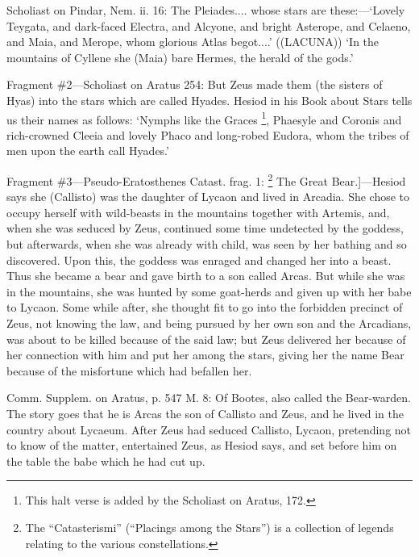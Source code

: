 Scholiast on Pindar, Nem. ii. 16: The Pleiades.... whose stars are
these:—‘Lovely Teygata, and dark-faced Electra, and Alcyone, and
bright Asterope, and Celaeno, and Maia, and Merope, whom glorious Atlas
begot....’ ((LACUNA)) ‘In the mountains of Cyllene she (Maia) bare
Hermes, the herald of the gods.’

Fragment \#2—Scholiast on Aratus 254: But Zeus made them (the sisters of
Hyas) into the stars which are called Hyades. Hesiod in his Book about Stars
tells us their names as follows: ‘Nymphs like the Graces \footnote{This halt verse is added
by the Scholiast on Aratus, 172.}, Phaesyle and Coronis and
rich-crowned Cleeia and lovely Phaco and long-robed Eudora, whom the tribes of
men upon the earth call Hyades.’

Fragment \#3—Pseudo-Eratosthenes Catast. frag. 1: \footnote{The
“Catasterismi” (“Placings among the Stars”) is a
collection of legends relating to the various constellations.} The Great
Bear.]—Hesiod says she (Callisto) was the daughter of Lycaon and lived in
Arcadia. She chose to occupy herself with wild-beasts in the mountains together
with Artemis, and, when she was seduced by Zeus, continued some time undetected
by the goddess, but afterwards, when she was already with child, was seen by
her bathing and so discovered. Upon this, the goddess was enraged and changed
her into a beast. Thus she became a bear and gave birth to a son called Arcas.
But while she was in the mountains, she was hunted by some goat-herds and given
up with her babe to Lycaon. Some while after, she thought fit to go into the
forbidden precinct of Zeus, not knowing the law, and being pursued by her own
son and the Arcadians, was about to be killed because of the said law; but Zeus
delivered her because of her connection with him and put her among the stars,
giving her the name Bear because of the misfortune which had befallen her.

Comm. Supplem. on Aratus, p. 547 M. 8: Of Bootes, also called the Bear-warden.
The story goes that he is Arcas the son of Callisto and Zeus, and he lived in
the country about Lycaeum. After Zeus had seduced Callisto, Lycaon, pretending
not to know of the matter, entertained Zeus, as Hesiod says, and set before him
on the table the babe which he had cut up.

